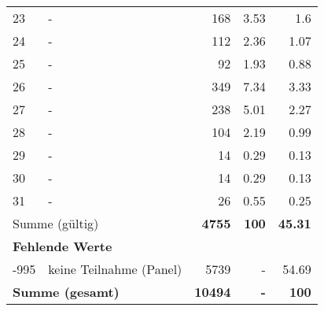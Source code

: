 \begin{longtable}{lXrrr}
        23 & \multicolumn{1}{X}{-} & %
          \num{168} &
          \num[round-mode=places,round-precision=2]{3,53} &
          \num[round-mode=places,round-precision=2]{1,6} \\

        24 & \multicolumn{1}{X}{-} & %
          \num{112} &
          \num[round-mode=places,round-precision=2]{2,36} &
          \num[round-mode=places,round-precision=2]{1,07} \\

        25 & \multicolumn{1}{X}{-} & %
          \num{92} &
          \num[round-mode=places,round-precision=2]{1,93} &
          \num[round-mode=places,round-precision=2]{0,88} \\

        26 & \multicolumn{1}{X}{-} & %
          \num{349} &
          \num[round-mode=places,round-precision=2]{7,34} &
          \num[round-mode=places,round-precision=2]{3,33} \\

        27 & \multicolumn{1}{X}{-} & %
          \num{238} &
          \num[round-mode=places,round-precision=2]{5,01} &
          \num[round-mode=places,round-precision=2]{2,27} \\

        28 & \multicolumn{1}{X}{-} & %
          \num{104} &
          \num[round-mode=places,round-precision=2]{2,19} &
          \num[round-mode=places,round-precision=2]{0,99} \\

        29 & \multicolumn{1}{X}{-} & %
          \num{14} &
          \num[round-mode=places,round-precision=2]{0,29} &
          \num[round-mode=places,round-precision=2]{0,13} \\

        30 & \multicolumn{1}{X}{-} & %
          \num{14} &
          \num[round-mode=places,round-precision=2]{0,29} &
          \num[round-mode=places,round-precision=2]{0,13} \\

        31 & \multicolumn{1}{X}{-} & %
          \num{26} &
          \num[round-mode=places,round-precision=2]{0,55} &
          \num[round-mode=places,round-precision=2]{0,25} \\

     \midrule
     \multicolumn{2}{l}{Summe (gültig)} &
       \textbf{\num{4755}} &
     \textbf{100} &
       \textbf{\num[round-mode=places,round-precision=2]{45,31}} \\
     \multicolumn{5}{l}{\textbf{Fehlende Werte}}\\
       -995 &
       keine Teilnahme (Panel) &
         \num{5739} &
        - &
         \num[round-mode=places,round-precision=2]{54,69} \\
     \midrule
     \multicolumn{2}{l}{\textbf{Summe (gesamt)}} &
          \textbf{\num{10494}} &
        \textbf{-} &
        \textbf{100} \\
     \bottomrule
     \end{longtable}
     
